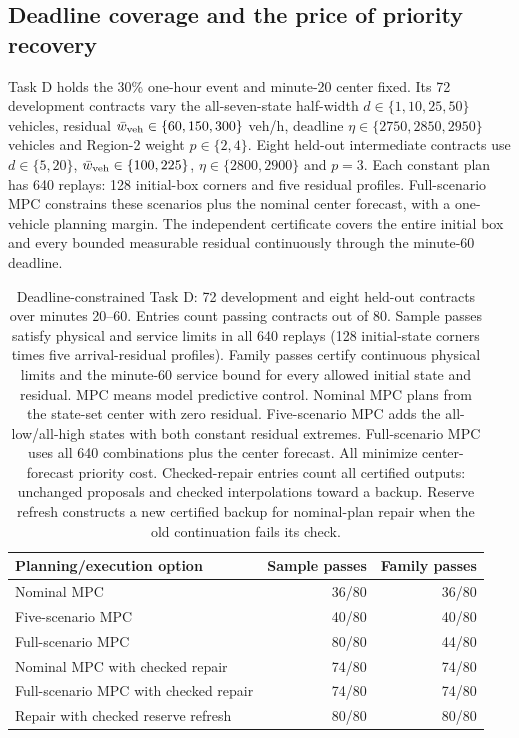 \documentclass[preprint,12pt]{elsarticle}
\begin{document}
\subsection{Deadline coverage and the price of priority recovery}
\label{sec:repair-results}

Task D holds the 30\% one-hour event and minute-20 center fixed. Its 72
development contracts vary the all-seven-state half-width
$d\in\{1,10,25,50\}$ vehicles, residual
$\bar w_{\rm veh}\in\{60,150,300\}$ veh/h, deadline
$\eta\in\{2750,2850,2950\}$ vehicles and Region-2 weight $p\in\{2,4\}$.
Eight held-out intermediate contracts use $d\in\{5,20\}$,
$\bar w_{\rm veh}\in\{100,225\}$, $\eta\in\{2800,2900\}$ and $p=3$.
Each constant plan has 640 replays: 128 initial-box corners and five
residual profiles. Full-scenario MPC constrains these scenarios plus the
nominal center forecast, with a one-vehicle planning margin. The independent
certificate covers the entire initial box and every bounded measurable
residual continuously through the minute-60 deadline.

\begin{table}[t]
\centering\small
\caption{Deadline-constrained Task D: 72 development and eight held-out
contracts over minutes 20--60. Entries count passing contracts out of 80.
Sample passes satisfy physical and service limits in all 640 replays
(128 initial-state corners times five arrival-residual profiles).
Family passes certify continuous physical limits and the minute-60 service
bound for every allowed initial state and residual. MPC means model predictive control.
Nominal MPC plans from the state-set center with zero residual.
Five-scenario MPC adds the all-low/all-high states with both constant
residual extremes. Full-scenario MPC uses all 640 combinations plus the
center forecast. All minimize center-forecast priority cost. Checked-repair
entries count all certified outputs: unchanged proposals and checked
interpolations toward a backup. Reserve refresh constructs a new certified
backup for nominal-plan repair when the old continuation fails its check.}
\label{tab:benchmark-deadlines}
\begin{tabular}{@{}lrr@{}}
\toprule
Planning/execution option & Sample passes & Family passes\\
\midrule
Nominal MPC & 36/80 & 36/80\\
Five-scenario MPC & 40/80 & 40/80\\
Full-scenario MPC & 80/80 & 44/80\\
Nominal MPC with checked repair & 74/80 & 74/80\\
Full-scenario MPC with checked repair & 74/80 & 74/80\\
Repair with checked reserve refresh & 80/80 & 80/80\\
\bottomrule
\end{tabular}
\end{table}
\end{document}
